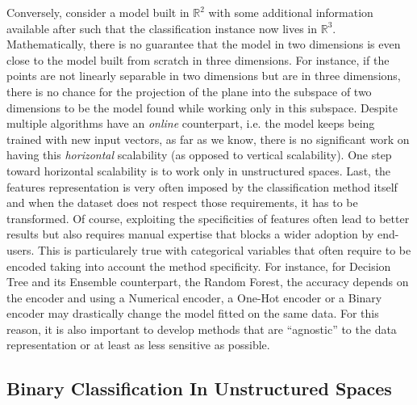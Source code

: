 \documentclass[preprint,12pt]{elsarticle}
\theoremstyle{definition}
\begin{document}
Conversely, consider a model built in $\mathbb{R}^2$ with some additional information available after such that the classification instance now lives in $\mathbb{R}^3$. Mathematically, there is no guarantee that the model in two dimensions is even close to the model built from scratch in three dimensions. For instance, if the points are not linearly  separable in two dimensions but are in three dimensions, there is no chance for the projection of the plane into the subspace of two dimensions to be the model found while working only in this subspace. Despite multiple algorithms have an {\it online} counterpart, i.e. the model keeps being trained with new input vectors, as far as we know, there is no significant work on having this {\it horizontal} scalability (as opposed to vertical scalability). One step toward horizontal scalability is to work only in unstructured spaces.
Last, the features representation is very often imposed by the classification method itself and when the dataset does not respect those requirements, it has to be transformed. Of course, exploiting the specificities of features often lead to better results but also requires manual expertise that blocks a wider adoption by end-users. This is particularely true with categorical variables that often require to be encoded taking into account the method specificity. For instance, for Decision Tree and its Ensemble counterpart, the Random Forest, the accuracy depends on the encoder and using a Numerical encoder, a One-Hot encoder or a Binary encoder may drastically change the model fitted on the same data. For this reason, it is also important to develop methods that are ``agnostic'' to the data representation or at least as less sensitive as possible.

\subsection{Binary Classification In Unstructured Spaces}
\end{document}

